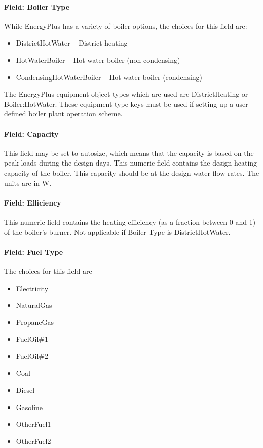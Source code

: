 \paragraph{Field: Boiler Type}\label{field-boiler-type}

While EnergyPlus has a variety of boiler options, the choices for this field are:

\begin{itemize}
\item
  DistrictHotWater -- District heating
\item
  HotWaterBoiler -- Hot water boiler (non-condensing)
\item
  CondensingHotWaterBoiler -- Hot water boiler (condensing)
\end{itemize}

The EnergyPlus equipment object types which are used are DistrictHeating or Boiler:HotWater. These equipment type keys must be used if setting up a user-defined boiler plant operation scheme.

\paragraph{Field: Capacity}\label{field-capacity-1}

This field may be set to autosize, which means that the capacity is based on the peak loads during the design days. This numeric field contains the design heating capacity of the boiler. This capacity should be at the design water flow rates. The units are in W.

\paragraph{Field: Efficiency}\label{field-efficiency-000}

This numeric field contains the heating efficiency (as a fraction between 0 and 1) of the boiler's burner. Not applicable if Boiler Type is DistrictHotWater.

\paragraph{Field: Fuel Type}\label{field-fuel-type-1-001}

The choices for this field are

\begin{itemize}
\item
  Electricity
\item
  NaturalGas
\item
  PropaneGas
\item
  FuelOil\#1
\item
  FuelOil\#2
\item
  Coal
\item
  Diesel
\item
  Gasoline
\item
  OtherFuel1
\item
  OtherFuel2
\end{itemize}

